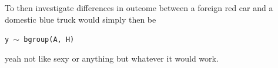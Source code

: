 \documentclass{article}
\begin{document}
To then investigate differences in outcome between a foreign red car and a domestic blue truck would simply then be

\begin{center}
\tt y $\sim$ bgroup(A, H)
\end{center}

yeah not like sexy or anything but whatever it would work.
\end{document}
